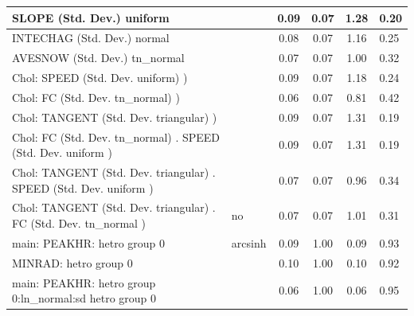 \begin{table}
\begin{center}
\begin{tabular}{|l|l|c|c|c|l|}
			\hline
			SLOPE (Std. Dev.) uniform &  & 0.09 & 0.07 & 1.28 & 0.20 \\
			\hline
			INTECHAG (Std. Dev.) normal &  & 0.08 & 0.07 & 1.16 & 0.25 \\
			\hline
			AVESNOW (Std. Dev.) tn_normal &  & 0.07 & 0.07 & 1.00 & 0.32 \\
			\hline
			 Chol: SPEED (Std. Dev. uniform) ) &  & 0.09 & 0.07 & 1.18 & 0.24 \\
			\hline
			 Chol: FC (Std. Dev. tn_normal) ) &  & 0.06 & 0.07 & 0.81 & 0.42 \\
			\hline
			 Chol: TANGENT (Std. Dev. triangular) ) &  & 0.09 & 0.07 & 1.31 & 0.19 \\
			\hline
			 Chol: FC (Std. Dev. tn_normal) . SPEED (Std. Dev.   uniform ) &  & 0.09 & 0.07 & 1.31 & 0.19 \\
			\hline
			 Chol: TANGENT (Std. Dev. triangular) . SPEED (Std. Dev.   uniform ) &  & 0.07 & 0.07 & 0.96 & 0.34 \\
			\hline
			 Chol: TANGENT (Std. Dev. triangular) . FC (Std. Dev.   tn_normal ) & no & 0.07 & 0.07 & 1.01 & 0.31 \\
			\hline
			main: PEAKHR: hetro group 0 & arcsinh & 0.09 & 1.00 & 0.09 & 0.93 \\
			\hline
			MINRAD: hetro group 0 &  & 0.10 & 1.00 & 0.10 & 0.92 \\
			\hline
			main: PEAKHR: hetro group 0:ln_normal:sd  hetro group 0 &  & 0.06 & 1.00 & 0.06 & 0.95 \\
			\hline
		\end{tabular}
	\end{center}
\end{table}